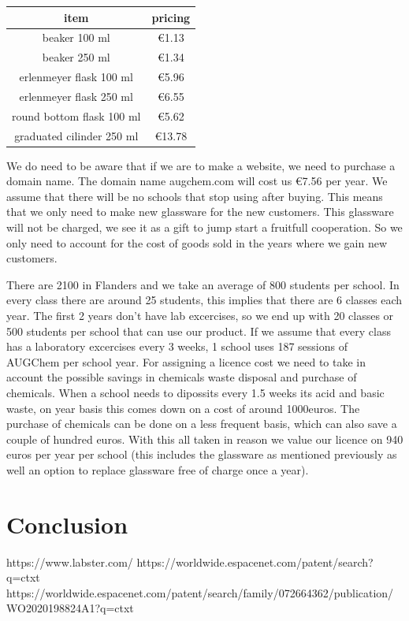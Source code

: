 \documentclass[%
    paper=A4,               %
    twoside=true,           %
    openany,              %
    parskip=full,           %
    chapterprefix=true,     %
    11pt,                   %
    headings=normal,        %
    bibliography=totoc,     %
    listof=totoc,           %
    titlepage=on,           %
    captions=tableabove,    %
    draft=false,            %
]{scrreprt}
\numberwithin{equation}{section}
\begin{document}
    \begin{table} [h!]
        \begin{tabular} {|c|c|}
            \label{tab:glassware}
            item & pricing \\
            \hline
            beaker 100 ml & \euro{1.13} \\
            beaker 250 ml & \euro{1.34} \\
            erlenmeyer flask 100 ml & \euro{5.96} \\
            erlenmeyer flask 250 ml & \euro{6.55} \\
            round bottom flask 100 ml & \euro{5.62} \\
            graduated cilinder 250 ml & \euro{13.78} \\
        \end{tabular} 

    We do need to be aware that if we are to make a website, we need to purchase a domain name. The domain name augchem.com will cost us \euro{7.56} per year.
    We assume that there will be no schools that stop using after buying. This means that we only need to make new glassware for the new customers. This glassware will not be 
    charged, we see it as a gift to jump start a fruitfull cooperation. So we only need to account for the cost of goods sold in the years where we gain new customers. 
    \end{table} 

    There are 2100 in Flanders and we take an average of 800 students per school. In every class there are around 25 students, this implies that there are 6 classes each year. The first 2 years 
    don't have lab excercises, so we end up with 20 classes or 500 students per school that can use our product. If we assume that every class has a laboratory excercises every 3 weeks, 1 school uses 
    187 sessions of AUGChem per school year. For assigning a licence cost we need to take in account the possible savings in chemicals waste disposal and purchase of chemicals. When a school needs to dipossits
    every 1.5 weeks its acid and basic waste, on year basis this comes down on a cost of around 1000euros. The purchase of chemicals can be done on a less frequent basis, which can also save a couple of hundred euros.
    With this all taken in reason we value our licence on 940 euros per year per school (this includes the glassware as mentioned previously as well an option to replace glassware free of charge once a year).


    \section{Conclusion}
    \label{sec:conclusion}

        https://www.labster.com/
        https://worldwide.espacenet.com/patent/search?q=ctxt%
        https://worldwide.espacenet.com/patent/search/family/072664362/publication/WO2020198824A1?q=ctxt%
\end{document}
